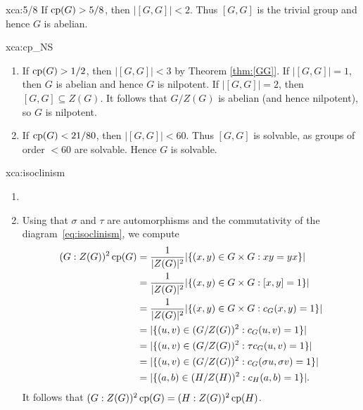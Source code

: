 \begin{sol}{xca:5/8}
    If $\operatorname{cp}(G)>5/8$, then $|[G,G]|<2$. Thus $[G,G]$ is the trivial group
    and hence $G$ is abelian. 
\end{sol}

\begin{sol}{xca:cp_NS}
\begin{enumerate}
    \item If $\operatorname{cp}(G)>1/2$, then $|[G,G]|<3$ by Theorem \ref{thm:[GG]}. If $|[G,G]|=1$, 
    then $G$ is abelian and hence $G$ is nilpotent. If $|[G,G]|=2$, then 
    $[G,G]\subseteq Z(G)$. 
    It follows that 
    $G/Z(G)$ is abelian (and hence nilpotent), so $G$ is nilpotent. 
    \item If $\operatorname{cp}(G)<21/80$, then 
    $|[G,G]|<60$. Thus $[G,G]$ is solvable, as groups of order $<60$ are solvable. 
    Hence $G$ is solvable. 
\end{enumerate}
\end{sol}


\begin{sol}{xca:isoclinism}
\begin{enumerate}
    \item 
    \item Using that $\sigma$ and 
    $\tau$ are automorphisms and 
    the commutativity of the diagram~\eqref{eq:isoclinism}, 
    we compute 
    \begin{align*}
        (G:Z(G))^2\operatorname{cp}(G) &= \frac{1}{|Z(G)|^2}|\{(x,y)\in G\times G:xy=yx\}|\\
        &=\frac{1}{|Z(G)|^2}|\{(x,y)\in G\times G:[x,y]=1\}|\\
        &=\frac{1}{|Z(G)|^2}|\{(x,y)\in G\times G:c_G(x,y)=1\}|\\
        &=|\{(u,v)\in (G/Z(G))^2:c_G(u,v)=1\}|\\
        &=|\{(u,v)\in (G/Z(G))^2:\tau c_G(u,v)=1\}|\\
        &=|\{(u,v)\in (G/Z(G))^2:c_G(\sigma u,\sigma v)=1\}|\\
        &=|\{(a,b)\in (H/Z(H))^2:c_H(a,b)=1\}|.
    \end{align*}
    It follows that $(G:Z(G))^2\operatorname{cp}(G)=(H:Z(G))^2\operatorname{cp}(H)$. 
\end{enumerate}
\end{sol}